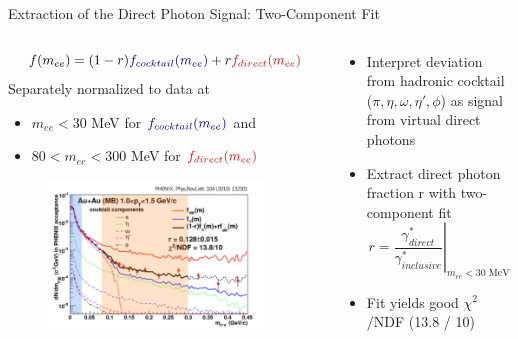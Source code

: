 \documentclass[aspectratio=169,10pt]{beamer}
\begin{document}
  \begin{frame}{Extraction of the Direct Photon Signal: Two-Component Fit}
   \begin{columns}
      \begin{column}{8.5cm}
        \begin{equation*}
         f (m_{ee}) = (1-r) \textcolor{AliceBlue}{f_{cocktail} (m_{ee})} + r \textcolor{AliceRed2}{f_{direct}(m_{ee})}
        \end{equation*}
        Separately normalized to data at
        \begin{itemize}
         \item $m_{ee} < 30$ MeV for $\textcolor{AliceBlue}{f_{cocktail} (m_{ee})}$ and 
         \item $80 < m_{ee} < 300$ MeV for $\textcolor{AliceRed2}{f_{direct}(m_{ee})}$
        \end{itemize}
        \vspace{-0.5cm}
       \begin{figure}
        \includegraphics[width=0.95\textwidth]{EMLectureWeek2018/PHENIXvirtualGamma.pdf}
       \end{figure}
      \end{column}
   \begin{column}{8cm}
       \vspace{1.4cm}
       \begin{itemize}
        \item Interpret deviation from hadronic cocktail ($\pi, \eta, \omega, \eta', \phi$) as signal from virtual direct photons
        \item Extract direct photon fraction r with two-component fit
              \begin{equation*}
               r = \left.\frac{\gamma^*_{direct}}{\gamma^*_{inclusive}}  \right|_{m_{ee} < 30 \text{ MeV}}
              \end{equation*}
        \item Fit yields good $\chi^2$/NDF (13.8 / 10)
       \end{itemize}
      \end{column}
   \end{columns}
  \end{frame}
\end{document}
